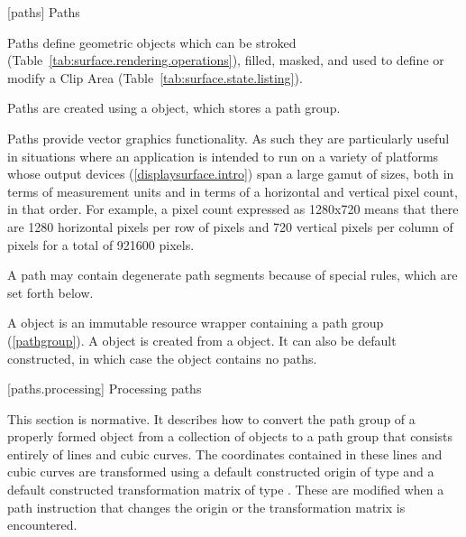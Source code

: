 
 [paths] {Paths}

\pnum
Paths define geometric objects which can be stroked (Table~\ref{tab:surface.rendering.operations}), filled, masked, and used to define or modify a Clip Area (Table~\ref{tab:surface.state.listing}).

\pnum
Paths are created using a  object, which stores a path group. 

\pnum
Paths provide vector graphics functionality. As such they are particularly useful in situations where an application is intended to run on a variety of platforms whose output devices (\ref{displaysurface.intro}) span a large gamut of sizes, both in terms of measurement units and in terms of a horizontal and vertical pixel count, in that order. For example, a pixel count expressed as 1280x720 means that there are 1280 horizontal pixels per row of pixels and 720 vertical pixels per column of pixels for a total of 921600 pixels.
%

\pnum
A path may contain degenerate path segments because of special rules, which are set forth below.

\pnum
A  object is an immutable resource wrapper containing a path group (\ref{pathgroup}). A  object is created from a  object. It can also be default constructed, in which case the  object contains no paths.

 [paths.processing] {Processing paths}

\pnum
This section is normative. It describes how to convert the path group of a properly formed  object from a collection of  objects to a path group that consists entirely of lines and cubic \bezierlocal curves. The coordinates contained in these lines and cubic \bezierlocal curves are transformed using a default constructed origin of type  and a default constructed transformation matrix of type . These are modified when a path instruction that changes the origin or the transformation matrix is encountered.

